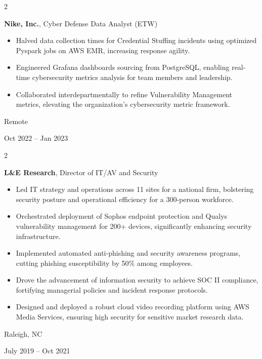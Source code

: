 \documentclass[10pt, letterpaper]{article}
\newenvironment{highlights}{
    \begin{itemize}[
        topsep=0.10 cm,
        parsep=0.10 cm,
        partopsep=0pt,
        itemsep=0pt,
        leftmargin=0.4 cm + 10pt
    ]
}{
    \end{itemize}
} %
\newenvironment{twocolentry}[2][]{
    \onecolentry
    \def\secondColumn{#2}
    \setcolumnwidth{\fill, 4.5 cm}
    \begin{paracol}{2}
}{
    \switchcolumn \raggedleft \secondColumn
    \end{paracol}
    \endonecolentry
} %
\begin{document}
        \vspace{0.2 cm}

        \begin{twocolentry}{
            Remote

        Oct 2022 – Jan 2023
        }
            \textbf{Nike, Inc.}, Cyber Defense Data Analyst (ETW)
            \begin{highlights}
                \item Halved data collection times for Credential Stuffing incidents using optimized Pyspark jobs on AWS EMR, increasing response agility.
                \item Engineered Grafana dashboards sourcing from PostgreSQL, enabling real-time cybersecurity metrics analysis for team members and leadership.
                \item Collaborated interdepartmentally to refine Vulnerability Management metrics, elevating the organization's cybersecurity metric framework.
            \end{highlights}
        \end{twocolentry}


        \vspace{0.2 cm}

        \begin{twocolentry}{
            Raleigh, NC

        July 2019 – Oct 2021
        }
            \textbf{L\&E Research}, Director of IT/AV and Security
            \begin{highlights}
                \item Led IT strategy and operations across 11 sites for a national firm, bolstering security posture and operational efficiency for a 300-person workforce.
                \item Orchestrated deployment of Sophos endpoint protection and Qualys vulnerability management for 200+ devices, significantly enhancing security infrastructure.
                \item Implemented automated anti-phishing and security awareness programs, cutting phishing susceptibility by 50\% among employees.
                \item Drove the advancement of information security to achieve SOC II compliance, fortifying managerial policies and incident response protocols.
                \item Designed and deployed a robust cloud video recording platform using AWS Media Services, ensuring high security for sensitive market research data.
            \end{highlights}
        \end{twocolentry}
\end{document}
